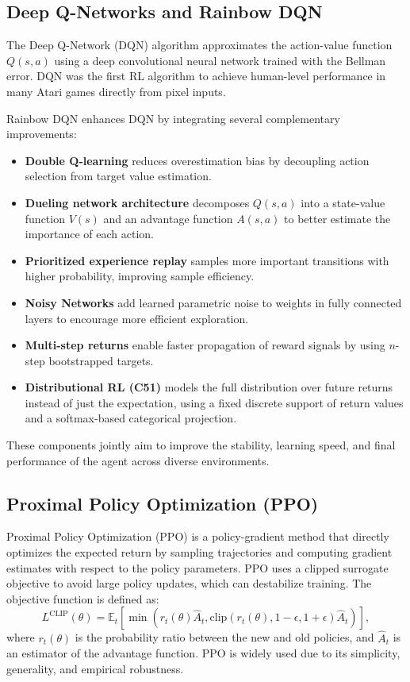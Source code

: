 \documentclass{article}
\begin{document}
\subsection{Deep Q-Networks and Rainbow DQN}

The Deep Q-Network (DQN) algorithm \cite{mnih2015human} approximates the action-value function $Q(s, a)$ using a deep convolutional neural network trained with the Bellman error. DQN was the first RL algorithm to achieve human-level performance in many Atari games directly from pixel inputs.

Rainbow DQN \cite{hessel2018rainbow} enhances DQN by integrating several complementary improvements:
\begin{itemize}
    \item \textbf{Double Q-learning} reduces overestimation bias by decoupling action selection from target value estimation.
    \item \textbf{Dueling network architecture} decomposes $Q(s, a)$ into a state-value function $V(s)$ and an advantage function $A(s, a)$ to better estimate the importance of each action.
    \item \textbf{Prioritized experience replay} samples more important transitions with higher probability, improving sample efficiency.
    \item \textbf{Noisy Networks} add learned parametric noise to weights in fully connected layers to encourage more efficient exploration.
    \item \textbf{Multi-step returns} enable faster propagation of reward signals by using $n$-step bootstrapped targets.
    \item \textbf{Distributional RL (C51)} models the full distribution over future returns instead of just the expectation, using a fixed discrete support of return values and a softmax-based categorical projection.
\end{itemize}

These components jointly aim to improve the stability, learning speed, and final performance of the agent across diverse environments.

\subsection{Proximal Policy Optimization (PPO)}

Proximal Policy Optimization (PPO) \cite{schulman2017proximal} is a policy-gradient method that directly optimizes the expected return by sampling trajectories and computing gradient estimates with respect to the policy parameters. PPO uses a clipped surrogate objective to avoid large policy updates, which can destabilize training. The objective function is defined as:
\[
L^{\text{CLIP}}(\theta) = \mathbb{E}_t \left[ \min \left( r_t(\theta) \hat{A}_t, \text{clip}(r_t(\theta), 1 - \epsilon, 1 + \epsilon) \hat{A}_t \right) \right],
\]
where $r_t(\theta)$ is the probability ratio between the new and old policies, and $\hat{A}_t$ is an estimator of the advantage function. PPO is widely used due to its simplicity, generality, and empirical robustness.
\end{document}
